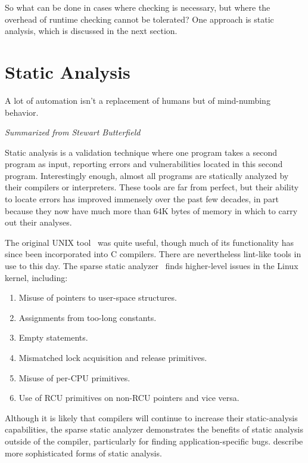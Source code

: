 So what can be done in cases where checking is necessary, but where the
overhead of runtime checking cannot be tolerated?
One approach is static analysis, which is discussed in the next section.

\fi

\section{Static Analysis}
\label{sec:debugging:Static Analysis}
%
\epigraph{A lot of automation isn't a replacement of
	  humans but of mind-numbing behavior.}
	 {\emph{Summarized from Stewart Butterfield}}

Static analysis is a validation technique where one program takes a second
program as input, reporting errors and vulnerabilities located in this
second program.
Interestingly enough, almost all programs are statically analyzed
by their compilers or interpreters.
These tools are far from perfect, but their ability to locate
errors has improved immensely over the past few decades, in part because
they now have much more than 64K bytes of memory in which to carry out their
analyses.

The original UNIX  tool~\cite{StephenJohnson1977lint} was
quite useful, though much of its functionality has since been incorporated
into C compilers.
There are nevertheless lint-like tools in use to this day.
The sparse static analyzer~\cite{JonathanCorbet2004sparse}
finds higher-level issues in the Linux kernel, including:

\begin{enumerate}
\item	Misuse of pointers to user-space structures.
\item	Assignments from too-long constants.
\item	Empty  statements.
\item	Mismatched lock acquisition and release primitives.
\item	Misuse of per-CPU primitives.
\item	Use of RCU primitives on non-RCU pointers and vice versa.
\end{enumerate}

Although it is likely that compilers will continue to increase their
static-analysis capabilities, the sparse static analyzer demonstrates
the benefits of static analysis outside of the compiler, particularly
for finding application-specific bugs.
describe more sophisticated forms of static analysis.

